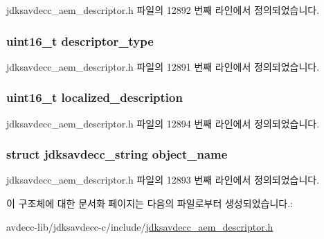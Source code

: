 jdksavdecc\+\_\+aem\+\_\+descriptor.\+h 파일의 12892 번째 라인에서 정의되었습니다.

\subsubsection[{\texorpdfstring{descriptor\+\_\+type}{descriptor_type}}]{\setlength{\rightskip}{0pt plus 5cm}uint16\+\_\+t descriptor\+\_\+type}\hypertarget{structjdksavdecc__descriptor__clock__source_ab7c32b6c7131c13d4ea3b7ee2f09b78d}{}\label{structjdksavdecc__descriptor__clock__source_ab7c32b6c7131c13d4ea3b7ee2f09b78d}


jdksavdecc\+\_\+aem\+\_\+descriptor.\+h 파일의 12891 번째 라인에서 정의되었습니다.

\subsubsection[{\texorpdfstring{localized\+\_\+description}{localized_description}}]{\setlength{\rightskip}{0pt plus 5cm}uint16\+\_\+t localized\+\_\+description}\hypertarget{structjdksavdecc__descriptor__clock__source_a0926f846ca65a83ad5bb06b4aff8f408}{}\label{structjdksavdecc__descriptor__clock__source_a0926f846ca65a83ad5bb06b4aff8f408}


jdksavdecc\+\_\+aem\+\_\+descriptor.\+h 파일의 12894 번째 라인에서 정의되었습니다.

\subsubsection[{\texorpdfstring{object\+\_\+name}{object_name}}]{\setlength{\rightskip}{0pt plus 5cm}struct {\bf jdksavdecc\+\_\+string} object\+\_\+name}\hypertarget{structjdksavdecc__descriptor__clock__source_a7d1f5945a13863b1762fc6db74fa8f80}{}\label{structjdksavdecc__descriptor__clock__source_a7d1f5945a13863b1762fc6db74fa8f80}


jdksavdecc\+\_\+aem\+\_\+descriptor.\+h 파일의 12893 번째 라인에서 정의되었습니다.



이 구조체에 대한 문서화 페이지는 다음의 파일로부터 생성되었습니다.\+:\begin{DoxyCompactItemize}
\item 
avdecc-\/lib/jdksavdecc-\/c/include/\hyperlink{jdksavdecc__aem__descriptor_8h}{jdksavdecc\+\_\+aem\+\_\+descriptor.\+h}\end{DoxyCompactItemize}
